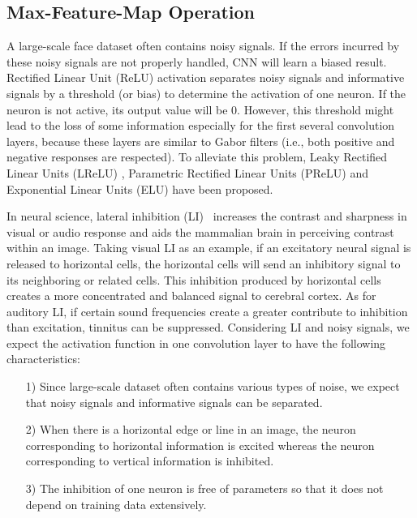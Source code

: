 \documentclass[journal,transmag]{IEEEtran}
\begin{document}
\subsection{Max-Feature-Map Operation}
A large-scale face dataset often contains noisy signals. If the errors incurred by these noisy signals are not properly handled, CNN will learn a biased result. Rectified Linear Unit (ReLU) \cite{nair2010rectified} activation separates noisy signals and informative signals by a threshold (or bias) to determine the activation of one neuron. If the neuron is not active, its output value will be 0. However, this threshold might lead to the loss of some information especially for the first several convolution layers, because these layers are similar to Gabor filters (i.e., both positive and negative responses are respected). To alleviate this problem, Leaky Rectified Linear Units (LReLU) \cite{maas2013rectifier}, Parametric Rectified Linear Units (PReLU) \cite{DBLP:conf/iccv/HeZRS15} and Exponential Linear Units (ELU) \cite{DBLP:journals/corr/ClevertUH15} have been proposed.

In neural science, lateral inhibition (LI)~\cite{Amari1977DynamicsOP} increases the contrast and sharpness in visual or audio response and aids the mammalian brain in perceiving contrast within an image. Taking visual LI as an example, if an excitatory neural signal is released to horizontal cells, the horizontal cells will send an inhibitory signal to its neighboring or related cells. This inhibition produced by horizontal cells creates a more concentrated and balanced signal to cerebral cortex. As for auditory LI, if certain sound frequencies create a greater contribute to inhibition than excitation, tinnitus can be suppressed. Considering LI and noisy signals, we expect the activation function in one convolution layer to have the following characteristics:
\begin{itemize}\setlength{\itemsep}{1pt}
\item[1)] Since large-scale dataset often contains various types of noise, we expect that noisy signals and informative signals can be separated.
\item[2)] When there is a horizontal edge or line in an image, the neuron corresponding to horizontal information is excited whereas the neuron corresponding to vertical information is inhibited.
\item[3)] The inhibition of one neuron is free of parameters so that it does not depend on training data extensively.
\end{itemize}
\end{document}
